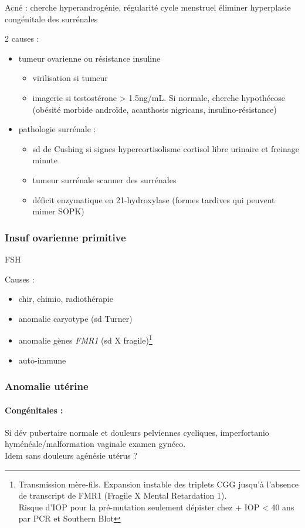 \documentclass[11pt]{article}
\begin{document}
Acné : cherche hyperandrogénie, régularité cycle menstruel \thus éliminer
hyperplasie congénitale des surrénales

2 causes :
\begin{itemize}
\item tumeur ovarienne ou résistance insuline
\begin{itemize}
\item virilisation si tumeur
\item imagerie si testostérone > 1.5ng/mL. Si normale, cherche hypothécose
(obésité morbide androïde, acanthosis nigricans, insulino-résistance)
\end{itemize}
\item pathologie surrénale :
\begin{itemize}
\item sd de Cushing si signes hypercortisolisme \thus cortisol libre urinaire et
freinage minute
\item tumeur surrénale \thus scanner des surrénales
\item déficit enzymatique en 21-hydroxylase (\danger formes tardives qui peuvent
mimer SOPK)
\end{itemize}
\end{itemize}
\subsubsection{Insuf ovarienne primitive}
\label{sec:org972950f}
\inc FSH

Causes :
\begin{itemize}
\item chir, chimio, radiothérapie
\item anomalie caryotype (sd Turner)
\item anomalie gènes \emph{FMR1} (sd X fragile)\footnote{Transmission mère-fils. Expansion instable des triplets CGG jusqu'à
l'absence de transcript de FMR1 (Fragile X Mental Retardation 1). \\
\danger Risque d'IOP pour la pré-mutation seulement \thus dépister chez
\female + IOP < 40 ans par PCR et Southern Blot}
\item auto-immune
\end{itemize}
\subsubsection{Anomalie utérine}
\label{sec:org1ac8d66}
\paragraph{Congénitales :}
\label{sec:orga6f5434}
Si dév pubertaire normale et douleurs pelviennes cycliques, imperfortanio
hyménéale/malformation vaginale \thus examen gynéco.\\
Idem sans douleurs \thus agénésie utérus ?
\end{document}
